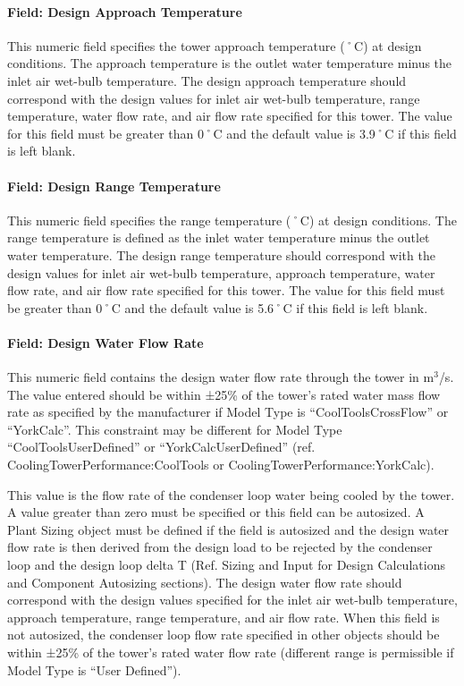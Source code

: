 \paragraph{Field: Design Approach Temperature}\label{field-design-approach-temperature}

This numeric field specifies the tower approach temperature (˚C) at design conditions. The approach temperature is the outlet water temperature minus the inlet air wet-bulb temperature. The design approach temperature should correspond with the design values for inlet air wet-bulb temperature, range temperature, water flow rate, and air flow rate specified for this tower. The value for this field must be greater than 0˚C and the default value is 3.9˚C if this field is left blank.

\paragraph{Field: Design Range Temperature}\label{field-design-range-temperature}

This numeric field specifies the range temperature (˚C) at design conditions. The range temperature is defined as the inlet water temperature minus the outlet water temperature. The design range temperature should correspond with the design values for inlet air wet-bulb temperature, approach temperature, water flow rate, and air flow rate specified for this tower. The value for this field must be greater than 0˚C and the default value is 5.6˚C if this field is left blank.

\paragraph{Field: Design Water Flow Rate}\label{field-design-water-flow-rate-3}

This numeric field contains the design water flow rate through the tower in m\(^{3}\)/s. The value entered should be within ±25\% of the tower's rated water mass flow rate as specified by the manufacturer if Model Type is ``CoolToolsCrossFlow'' or ``YorkCalc''. This constraint may be different for Model Type ``CoolToolsUserDefined'' or ``YorkCalcUserDefined'' (ref. CoolingTowerPerformance:CoolTools or CoolingTowerPerformance:YorkCalc).

This value is the flow rate of the condenser loop water being cooled by the tower. A value greater than zero must be specified or this field can be autosized. A Plant Sizing object must be defined if the field is autosized and the design water flow rate is then derived from the design load to be rejected by the condenser loop and the design loop delta T (Ref. Sizing and Input for Design Calculations and Component Autosizing sections). The design water flow rate should correspond with the design values specified for the inlet air wet-bulb temperature, approach temperature, range temperature, and air flow rate. When this field is not autosized, the condenser loop flow rate specified in other objects should be within ±25\% of the tower's rated water flow rate (different range is permissible if Model Type is ``User Defined'').

